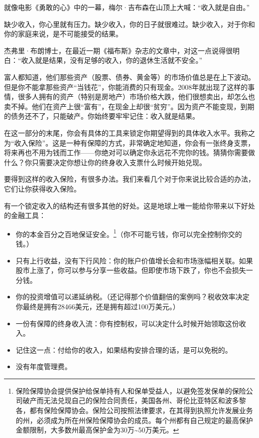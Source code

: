 就像电影《勇敢的心》中的一幕，梅尔·吉布森在山顶上大喊：“收入就是自由。”

缺少收入，你心里就有压力。缺少收入，你的日子就很难过。缺少收入，对于你和你的家庭来说，是不可能接受的结果。

杰弗里·布朗博士，在最近一期《福布斯》杂志的文章中，对这一点说得很明白：“收入就是结果，没有足够的收入，你的退休生活就不安全。”

富人都知道，他们那些资产（股票、债券、黄金等）的市场价值总是在上下波动。但是你不能拿那些资产“当钱花”，你能消费的只有现金。2008年就出现了这样的事情，很多人拥有的资产（特别是房地产）市场价格大跌，他们很想卖出，却怎么也卖不掉。他们在资产上很“富有”，在现金上却很“贫穷”。因为资产不能变现，到期的债务还不了，只能破产。你始终要牢牢记住：收入就是结果。

在这一部分的末尾，你会有具体的工具来锁定你期望得到的具体收入水平。我称之为“收入保险”。这是一种有保障的方式，非常确定地知道，你会有一张终身支票，将来再也不用为钱而工作——你绝对可以确定你永远花不完你的钱。猜猜你需要做什么？你只需要决定你想让你的终身收入支票什么时候开始兑现。

要得到这样的收入保险，有很多办法。我们来看几个对于你来说比较合适的办法，它们让你获得收入保险。

有一个锁定收入的结构还有很多其他的好处。这是地球上唯一能给你带来以下好处的金融工具：

\begin{itemize}
\item 你的本金百分之百地保证安全。\footnote{\label{fn:pdf-28-1}保险保障协会提供保护给保单持有人和保单受益人，以避免签发保单的保险公司破产而无法兑现自己的保险合同责任，美国各州、哥伦比亚特区和波多黎各，都有保险保障协会。保险公司按照法律要求，在其得到执照允许发展业务的州，必须成为所在州保险保障协会的成员。每个州都有自己规定的最高保护金额限制，大多数州最高保护金为30万\textasciitilde{}50万美元。}（你不可能亏钱，你可以完全控制你交的钱。）
\item 只有上行收益，没有下行风险：你的账户价值增长会和市场涨幅相关联。如果股市上涨了，你可以参与分享一些收益。但即使市场下跌了，你也不会损失一分钱。
\item 你的投资增值可以递延纳税。（还记得那个价值翻倍的案例吗？税收效率决定你最终是拥有28466美元，还是拥有超过100万美元。）
\item 一份有保障的终身收入流：你有控制权，可以决定什么时候开始领取这份收入。
\item 记住这一点：付给你的收入，如果结构安排合理的话，是可以免税的。
\item 没有年度管理费。
\end{itemize}

